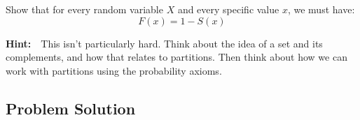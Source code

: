 \documentclass[12pt]{article}
\theoremstyle{definition}
\begin{document}
Show that for every random variable $X$ and every specific value $x$, we must have:
$$
F(x) = 1 - S(x)
$$

\bigskip
\noindent
{\bf Hint:}\ \ This isn't particularly hard. Think about the idea of a set and its complements, and how that relates to partitions. Then think about how we can work with partitions using the probability axioms.



\subsection*{Problem Solution}
\end{document}
